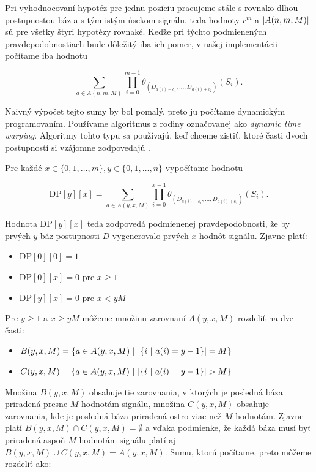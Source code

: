 Pri vyhodnocovaní hypotéz pre jednu pozíciu pracujeme stále s rovnako dlhou postupnosťou báz a s tým istým úsekom signálu, teda hodnoty
$r^m$ a $\abs*{A(n, m, M)}$ sú pre všetky štyri hypotézy rovnaké. Keďže pri týchto podmienených pravdepodobnostiach bude dôležitý iba ich
pomer, v našej implementácii počítame iba hodnotu

$$\sum\limits_{a \in A(n, m, M)} \prod\limits_{i=0}^{m-1} \theta_{(D_{a(i)-c_1}, \dots, D_{a(i)+c_2})}(S_i) \text{.}$$

Naivný výpočet tejto sumy by bol pomalý, preto ju počítame dynamickým programovaním.
Používame algoritmus z rodiny označovanej ako \emph{dynamic time warping}. Algoritmy tohto typu sa používajú, keď chceme zistiť,
ktoré časti dvoch postupností si vzájomne zodpovedajú \cite{DynamicTimeWarping}.

Pre každé $x \in \{0, 1, \dots, m\}, y \in \{0, 1, \dots, n\}$ vypočítame hodnotu

$$\textrm{DP}[y][x] = \sum\limits_{a \in A(y, x, M)} \prod\limits_{i=0}^{x-1} \theta_{(D_{a(i)-c_1}, \dots, D_{a(i)+c_2})}(S_i) \text{.}$$

Hodnota $\textrm{DP}[y][x]$ teda zodpovedá podmienenej pravdepodobnosti, že by prvých $y$ báz postupnosti $D$ vygenerovalo prvých $x$ hodnôt signálu.
Zjavne platí:
\begin{itemize}
\item $\textrm{DP}[0][0] = 1$
\item $\textrm{DP}[0][x] = 0$ pre $x \geq 1$
\item $\textrm{DP}[y][x] = 0$ pre $x < y M$
\end{itemize} 

Pre $y \geq 1$ a $x \geq y M$ môžeme množinu zarovnaní $A(y, x, M)$ rozdeliť na dve časti:

\begin{itemize}

\item $B(y, x, M) = \{a \in A(y, x, M) ~|~ \abs*{\{i ~|~ a(i) = y-1\}} = M\}$
\item $C(y, x, M) = \{a \in A(y, x, M) ~|~ \abs*{\{i ~|~ a(i) = y-1\}} > M\}$

\end{itemize}

Množina $B(y, x, M)$ obsahuje tie zarovnania, v ktorých je posledná báza priradená presne $M$ hodnotám signálu, množina $C(y, x, M)$ obsahuje
zarovnania, kde je posledná báza priradená ostro viac než $M$ hodnotám. Zjavne platí $B(y, x, M) \cap C(y, x, M) = \emptyset$ a vďaka podmienke,
že každá báza musí byť priradená aspoň $M$ hodnotám signálu platí aj $B(y, x, M) \cup C(y, x, M) = A(y, x, M)$. Sumu, ktorú počítame, preto
môžeme rozdeliť ako:

